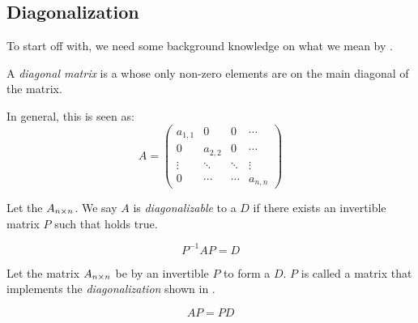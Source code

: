\subsection{Diagonalization}\label{subsec:Diagonalization}
To start off with, we need some background knowledge on what we mean by .

\begin{definition}\label{def:Diagonal_Matrix}
  A \emph{diagonal matrix} is a  whose only non-zero elements are on the main diagonal of the matrix.

  In general, this is seen as:
  \begin{equation}\label{eq:Diagonal_Matrix}
    A =
    \begin{pmatrix}
      a_{1,1} & 0 & 0 & \cdots \\
      0 & a_{2,2} & 0 & \cdots \\
      \vdots & \ddots & \ddots & \vdots \\
      0 & \cdots & \cdots & a_{n, n}
    \end{pmatrix}
  \end{equation}
\end{definition}

\begin{definition}[Diagonalizable]\label{def:Diagonalizable}
  Let the  $A_{n \times n}$.
  We say $A$ is \emph{diagonalizable} to a  $D$ if there exists an invertible matrix $P$ such that  holds true.

  \begin{equation}\label{eq:Diagonalizable}
    P^{-1} A P = D
  \end{equation}
\end{definition}

\begin{definition}[Diagonalization]\label{def:Diagonalization}
  Let the matrix $A_{n \times n}$ be  by an invertible  $P$ to form a  $D$.
  $P$ is called a matrix that implements the \emph{diagonalization} shown in .

  \begin{equation}\label{eq:Diagonalization}
    AP = PD
  \end{equation}
\end{definition}

